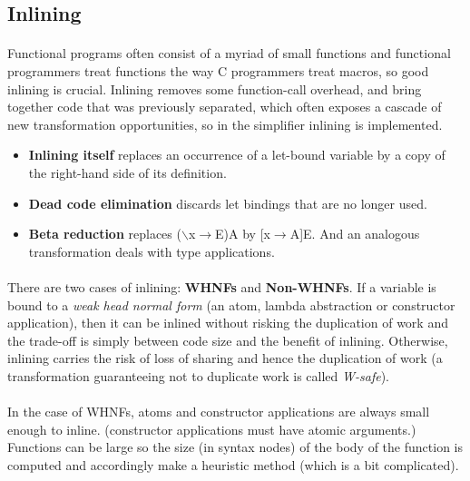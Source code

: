 \documentclass{article}
\begin{document}
	\subsection{Inlining}
	\paragraph{}
	Functional programs often consist of a myriad of small functions and functional programmers treat functions the way C programmers treat macros, so good inlining is crucial. Inlining removes some function-call overhead, and bring together code that was previously separated, which often exposes a cascade of new transformation opportunities, so in the simplifier inlining is implemented.
	\begin{itemize}
		\item \textbf{Inlining itself} replaces an occurrence of a let-bound variable by a copy of the right-hand side of its definition.
		\item \textbf{Dead code elimination} discards let bindings that are no longer used.
		\item \textbf{Beta reduction} replaces ($\backslash$x$\rightarrow$E)A by [x$\rightarrow$A]E. And an analogous transformation deals with type applications.
	\end{itemize}
	\paragraph{}
	There are two cases of inlining: \textbf{WHNFs} and \textbf{Non-WHNFs}. If a variable is bound to a \emph{weak head normal form} (an atom, lambda abstraction or constructor application), then it can be inlined without risking the duplication of work and the trade-off is simply between code size and the benefit of inlining. Otherwise, inlining carries the risk of loss of sharing and hence the duplication of work (a transformation guaranteeing not to duplicate work is called \emph{W-safe}).
	\paragraph{}
	In the case of WHNFs, atoms and constructor applications are always small enough to inline. (constructor applications must have atomic arguments.) Functions can be large so the size (in syntax nodes) of the body of the function is computed and accordingly make a heuristic method (which is a bit complicated).
\end{document}
